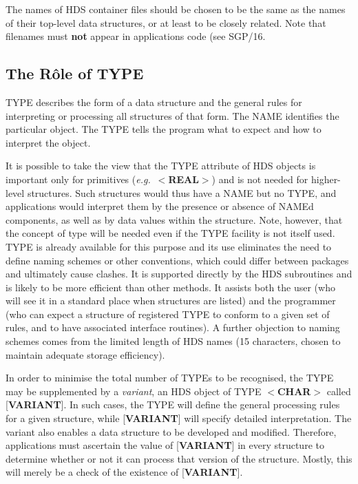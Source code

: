 \documentclass[twoside,11pt]{article}
\newcommand{\xref}[3]{#1}
\newcommand{\xlabel}[1]{}
\renewcommand{\_}{\texttt{\symbol{95}}}
\begin{document}
The names of HDS container files should be chosen to be the
same as the names of their top-level data structures, or at
least to be closely related.  Note that filenames must {\bf not}
appear in applications code (see \xref{SGP/16}{sgp16}).

\subsection{\xlabel{se_roleoftype}The R\^{o}le of TYPE\label{se:roleoftype}}

TYPE describes the form of a data structure and the general rules
for interpreting or processing all structures of that form.  The NAME
identifies the particular object.  The TYPE tells the program what to
expect and how to interpret the object.

It is possible to take the view that the TYPE attribute
of HDS objects is important only for
primitives ({\it e.g.}\  $<${\bf \_REAL}$>$) and is not needed for
higher-level structures.
Such structures would thus have a NAME but no TYPE, and applications
would interpret them by the presence or absence of NAMEd components, as
well as by data values within the structure.
Note, however, that the concept of type will be needed even if the
TYPE facility is not itself used.
TYPE is already available for this purpose and its use eliminates
the need to define naming schemes or other conventions, which could
differ between packages and ultimately cause clashes.  It is supported
directly by the HDS subroutines and is likely to be more efficient than
other methods.  It assists both the user (who will see it in a standard
place when structures are listed) and the programmer (who can expect a
structure of registered TYPE to conform to a given set of rules,
and to have associated interface routines).  A
further objection to naming schemes comes from the limited length of HDS
names (15 characters, chosen to maintain adequate storage efficiency).

In order to minimise the total number of TYPEs to be recognised,
the TYPE may be supplemented by
a {\it variant}, an HDS object
of TYPE $<${\bf \_CHAR}$>$
called [{\bf VARIANT}{]}.  In such cases,
the TYPE will define the general processing rules for a given
structure, while
{[}{\bf VARIANT}{]}
will specify detailed interpretation.  The variant also enables a data
structure to be developed and modified.  Therefore, applications must
ascertain the value of {[}{\bf VARIANT}{]} in every structure to
determine whether or not it can process that version of the structure.
Mostly, this will merely be a check of the existence of {[}{\bf VARIANT}{]}.
\end{document}
